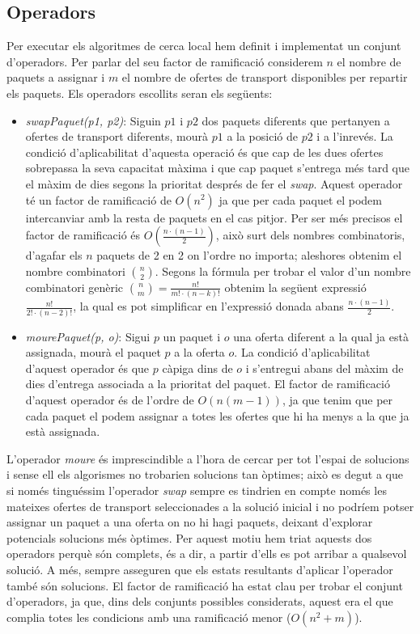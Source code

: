 \documentclass[a4paper]{article}
\begin{document}
	\subsection{Operadors}
	
	Per executar els algoritmes de cerca local hem definit i implementat un conjunt d'operadors. Per parlar del seu factor de ramificació considerem $n$ el nombre de paquets a assignar i $m$ el nombre de ofertes de transport disponibles per repartir els paquets. Els operadors escollits seran els següents:
	
	\begin{itemize}
		\item \emph{swapPaquet(p1, p2)}: Siguin $p1$ i $p2$ dos paquets diferents que pertanyen a ofertes de transport diferents, mourà $p1$ a la posició de $p2$ i a l'inrevés. La condició d'aplicabilitat d'aquesta operació és que cap de les dues ofertes sobrepassa la seva capacitat màxima i que cap paquet s'entrega més tard que el màxim de dies segons la prioritat després de fer el \textit{swap}. Aquest operador té un factor de ramificació de $O(n^2)$ ja que per cada paquet el podem intercanviar amb la resta de paquets en el cas pitjor. Per ser més precisos el factor de ramificació és $O(\frac{n·(n-1)}{2})$, això surt dels nombres combinatoris, d'agafar els $n$ paquets de 2 en 2 on l'ordre no importa; aleshores obtenim el nombre combinatori $\binom{n}{2}$. Segons la fórmula per trobar el valor d'un nombre combinatori genèric $\binom{n}{m} = \frac{n!}{m!·(n-k)!}$ obtenim la següent expressió $\frac{n!}{2!·(n-2)!}$, la qual es pot simplificar en l'expressió donada abans $\frac{n·(n-1)}{2}$.


		\item \emph{mourePaquet(p, o)}: Sigui $p$ un paquet i $o$ una oferta diferent a la qual ja està assignada, mourà el paquet $p$ a la oferta $o$. La condició d'aplicabilitat d'aquest operador és que $p$ càpiga dins de $o$ i s'entregui abans del màxim de dies d'entrega associada a la prioritat del paquet. El factor de ramificació d'aquest operador és de l'ordre de $O(n(m-1))$, ja que tenim que per cada paquet el podem assignar a totes les ofertes que hi ha menys a la que ja està assignada.
	\end{itemize}
	
 L'operador \textit{moure} és imprescindible a l'hora de cercar per tot l'espai de solucions i sense ell els algorismes no trobarien solucions tan òptimes; això es degut a que si només tinguéssim l'operador \textit{swap} sempre es tindrien en compte només les mateixes ofertes de transport seleccionades a la solució inicial i no podríem potser assignar un paquet a una oferta on no hi hagi paquets, deixant d'explorar potencials solucions més òptimes. Per aquest motiu hem triat aquests dos operadors perquè són complets, és a dir, a partir d'ells es pot arribar a qualsevol solució. A més, sempre asseguren que els estats resultants d'aplicar l'operador també són solucions. El factor de ramificació ha estat clau per trobar el conjunt d'operadors, ja que, dins dels conjunts possibles considerats, aquest era el que complia totes les condicions amb una ramificació menor ($O(n^2+m)$).
	
\end{document}
